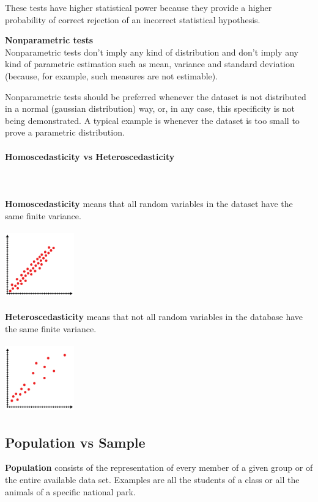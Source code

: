 \documentclass{article}
\begin{document}
These tests have higher statistical power because they provide a higher probability of correct rejection of an incorrect statistical hypothesis. 

\textbf{Nonparametric tests}\mbox{} \\
Nonparametric tests don’t imply any kind of distribution and don’t imply any kind of parametric estimation such as mean, variance and standard deviation (because, for example, such measures are not estimable).

Nonparametric tests should be preferred whenever the dataset is not distributed in a normal (gaussian distribution) way, or, in any case, this specificity is not being demonstrated. A typical example is whenever the dataset is too small to prove a parametric distribution.

\paragraph{Homoscedasticity vs Heteroscedasticity}\mbox{} \\ 
\mbox{} \\

\textbf{Homoscedasticity} means that all random variables in the dataset have the same finite variance.

\includegraphics[width=3cm, height=3cm]{homoscedasticity}

\textbf{Heteroscedasticity}  means that not all random variables in the database have the same finite variance.

\includegraphics[width=3cm, height=3cm]{heteroscedasticity}

\subsection{Population vs Sample}

\textbf{Population} consists of the representation of every member of a given group or of the entire available data set.
Examples are all the students of a class or all the animals of a specific national park.
\end{document}
